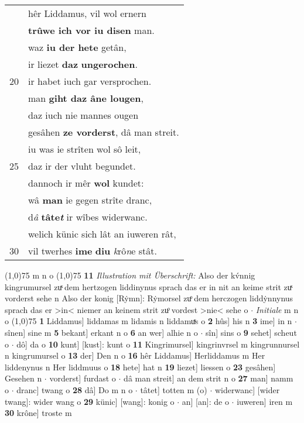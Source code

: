\documentclass[8pt,a4paper,notitlepage]{article}
\begin{document}
\begin{table}[ht]
\begin{minipage}[t]{0.5\linewidth}
\begin{tabular}{rl}
 & hêr Liddamus, vil wol ernern\\ 
 & \textbf{trûwe ich vor iu disen} man.\\ 
 & waz \textbf{iu der hete} getân,\\ 
 & ir liezet \textbf{daz} \textbf{ungerochen}.\\ 
20 & ir habet iuch gar versprochen.\\ 
 & man \textbf{giht daz âne lougen},\\ 
 & daz iuch nie mannes ougen\\ 
 & gesâhen \textbf{ze vorderst}, dâ man streit.\\ 
 & iu was ie strîten wol sô leit,\\ 
25 & daz ir der vluht begundet.\\ 
 & dannoch ir mêr \textbf{wol} kundet:\\ 
 & wâ \textbf{man} ie gegen strîte dranc,\\ 
 & d\textit{â} \textbf{tâte\textit{t}} ir wîbes widerwanc.\\ 
 & welich künic sich lât an iuweren rât,\\ 
30 & vil twerhes \textbf{ime} \textbf{diu} \textit{k}rô\textit{n}e stât.\\ 
\end{tabular}
\scriptsize
\line(1,0){75} \newline
m n o \newline
\line(1,0){75} \newline
\textbf{11} \textit{Illustration mit Überschrift:} Also der kv́nnig kingrumursel zuͯ dem hertzogen liddinynus sprach das er in nit an keime strit zuͯ vorderst sehe n  Also der konig [Rẏmn]: Rẏmorsel zuͦ dem herczogen liddẏnnynus sprach das er >in< niemer an keinem strit zuͦ vordest >nie< sehe o   $\cdot$ \textit{Initiale} m n o  \newline
\line(1,0){75} \newline
\textbf{1} Liddamus] liddamas m lidamis n liddamuͯs o \textbf{2} hûs] his n \textbf{3} ime] in n  $\cdot$ sînen] sine m \textbf{5} bekant] erkant n o \textbf{6} an wer] alhie n o  $\cdot$ sîn] sins o \textbf{9} sehet] scheut o  $\cdot$ dô] da o \textbf{10} kunt] [kust]: kunt o \textbf{11} Kingrimursel] kingrinvrsel m kingrunnursel n kingrumursel o \textbf{13} der] Den n o \textbf{16} hêr Liddamus] Herliddamus m Her liddenynus n Her liddmuus o \textbf{18} hete] hat n \textbf{19} liezet] liessen o \textbf{23} gesâhen] Gesehen n  $\cdot$ vorderst] furdast o  $\cdot$ dâ man streit] an dem strit n o \textbf{27} man] namm o  $\cdot$ dranc] twang o \textbf{28} dâ] Do m n o  $\cdot$ tâtet] totten m (o)  $\cdot$ widerwanc] [wider twang]: wider wang o \textbf{29} künic] [wang]: konig o  $\cdot$ an] [an]: de o  $\cdot$ iuweren] iren m \textbf{30} krône] troste m \newline
\end{minipage}
\end{table}
\end{document}
